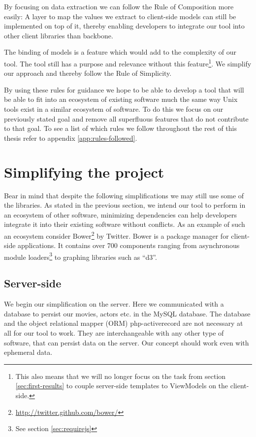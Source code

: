 \documentclass[thesis.tex]{subfiles}
\begin{document}
By focusing on data extraction we can follow the Rule of Composition more
easily: A layer to map the values we extract to client-side models can still be
implemented on top of it, thereby enabling developers to integrate our tool into
other client libraries than backbone.

The binding of models is a feature which would add to the complexity of our
tool. The tool still has a purpose and relevance without this
feature\footnote{This also means that we will no longer focus on the task from
	section \ref{sec:first-results} to couple server-side templates to ViewModels
	on the client-side.}.
We simplify our approach and thereby follow the Rule of Simplicity.

By using these rules for guidance we hope to be able to develop a tool that will
be able to fit into an ecosystem of existing software much the same way
Unix tools exist in a similar ecosystem of software.
To do this we focus on our previously stated goal and remove all superfluous
features that do not contribute to that goal.
To see a list of which rules we follow throughout the rest of this thesis
refer to appendix \ref{app:rules-followed}.

\section{Simplifying the project}
\label{sec:simplifying}
Bear in mind that despite the following simplifications we may still use some
of the libraries.
As stated in the previous section, we intend our tool to perform in an ecosystem
of other software, minimizing dependencies can help developers integrate it into
their existing software without conflicts. As an example of such an ecosystem
consider Bower\footnote{\url{http://twitter.github.com/bower/}} by Twitter.
Bower is a package manager for client-side applications. It contains over 700
components ranging from asynchronous module
loaders\footnote{See section \ref{sec:requirejs}} to graphing libraries such
as ``d3''.

\subsection{Server-side}
\label{sec:simple-server}
We begin our simplification on the server. Here we communicated with a database
to persist our movies, actors etc. in the MySQL database. The database and the
object relational mapper (ORM) php-activerecord are not necessary at all for our
tool to work. They are interchangeable with any other type of software, that can
persist data on the server. Our concept should work even with ephemeral data.
\end{document}
